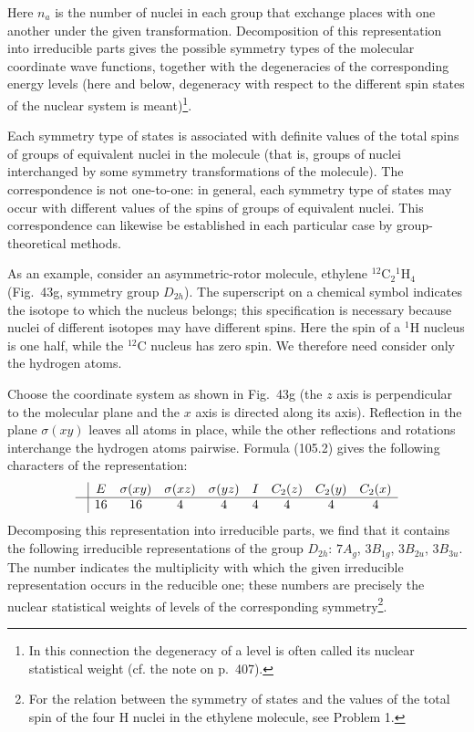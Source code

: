 Here $n_a$ is the number of nuclei in each group that exchange places with one another under the given transformation. Decomposition of this representation into irreducible parts gives the possible symmetry types of the molecular coordinate wave functions, together with the degeneracies of the corresponding energy levels (here and below, degeneracy with respect to the different spin states of the nuclear system is meant)\footnote{In this connection the degeneracy of a level is often called its nuclear statistical weight (cf. the note on p.~407).}.

Each symmetry type of states is associated with definite values of the total spins of groups of equivalent nuclei in the molecule (that is, groups of nuclei interchanged by some symmetry transformations of the molecule). The correspondence is not one-to-one: in general, each symmetry type of states may occur with different values of the spins of groups of equivalent nuclei. This correspondence can likewise be established in each particular case by group-theoretical methods.

As an example, consider an asymmetric-rotor molecule, ethylene ${}^{12}\mathrm C_2{}^1\mathrm H_4$ (Fig.~43g, symmetry group $D_{2h}$). The superscript on a chemical symbol indicates the isotope to which the nucleus belongs; this specification is necessary because nuclei of different isotopes may have different spins. Here the spin of a ${}^1\mathrm H$ nucleus is one half, while the ${}^{12}\mathrm C$ nucleus has zero spin. We therefore need consider only the hydrogen atoms.

Choose the coordinate system as shown in Fig.~43g (the $z$ axis is perpendicular to the molecular plane and the $x$ axis is directed along its axis). Reflection in the plane $\sigma(xy)$ leaves all atoms in place, while the other reflections and rotations interchange the hydrogen atoms pairwise. Formula (105.2) gives the following characters of the representation:
\[
\begin{array}{c|cccccccc}
 &E&\sigma(xy)&\sigma(xz)&\sigma(yz)&I&C_2(z)&C_2(y)&C_2(x)\\ \hline
 &16&16&4&4&4&4&4&4
\end{array}
\]
Decomposing this representation into irreducible parts, we find that it contains the following irreducible representations of the group $D_{2h}$: $7A_g$, $3B_{1g}$, $3B_{2u}$, $3B_{3u}$. The number indicates the multiplicity with which the given irreducible representation occurs in the reducible one; these numbers are precisely the nuclear statistical weights of levels of the corresponding symmetry\footnote{For the relation between the symmetry of states and the values of the total spin of the four H nuclei in the ethylene molecule, see Problem 1.}.


